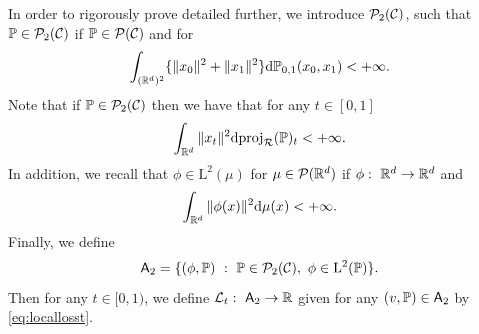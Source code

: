 \documentclass{article}
\begin{document}
In order to rigorously prove  detailed further, we introduce $\mathcal{P}_2(\mathcal{C})$, such that $\mathbb{P} \in \mathcal{P}_2(\mathcal{C})$ if $\mathbb{P} \in \mathcal{P}(\mathcal{C})$ and for 
\begin{equation}
    \int_{(\mathbb{R}^d)^2} \{ \| x_0 \|^2 + \|x_1 \|^2 \} \mathrm{d} \mathbb{P}_{0,1}(x_0, x_1) < +\infty .
\end{equation}
Note that if $\mathbb{P} \in \mathcal{P}_2(\mathcal{C})$ then we have that for any $t \in [0,1]$
\begin{equation}
    \int_{\mathbb{R}^d} \| x_t \|^2 \mathrm{d} \mathrm{proj}_{\mathcal{R}}(\mathbb{P})_t < +\infty . 
\end{equation}
In addition, we recall that $\phi \in \mathrm{L}^2(\mu)$ for $\mu \in \mathcal{P}(\mathbb{R}^d)$ if $\phi: \ \mathbb{R}^d \to \mathbb{R}^d$ and 
\begin{equation}
   \int_{\mathbb{R}^d} \| \phi(x) \|^2 \mathrm{d} \mu(x) < +\infty .
\end{equation}
Finally, we define 
\begin{equation}
    \mathsf{A}_2 = \{ (\phi, \mathbb{P}) \ : \ \mathbb{P} \in \mathcal{P}_2(\mathcal{C}), \ \phi \in \mathrm{L}^2(\mathbb{P}) \} .  
\end{equation}
Then for any $t \in [0,1)$, we define $\mathcal{L}_t : \ \mathsf{A}_2 \to \mathbb{R}$ given for any $(v, \mathbb{P}) \in \mathsf{A}_2$ by \eqref{eq:locallosst}.
\end{document}
